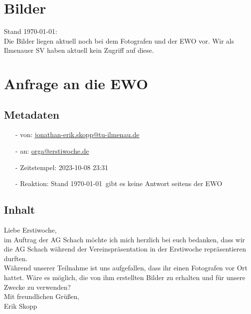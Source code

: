 \documentclass[a4paper,ngerman]{tui-algo-seminar}
\begin{document}
\section{Bilder}
Stand \today: \\
Die Bilder liegen aktuell noch bei dem Fotografen und der EWO vor. Wir als Ilmenauer SV haben aktuell kein Zugriff auf diese. 

\section{Anfrage an die EWO}
\subsection{Metadaten}
\begin{itemize}
    \item[-] von: \hyperlink{mailto:jonathan-erik.skopp@tu-ilmenau.de}{jonathan-erik.skopp@tu-ilmenau.de}
    \item[-] an:  \hyperlink{mailto:orga@erstiwoche.de}{orga@erstiwoche.de}
    \item[-] Zeitstempel:  2023-10-08 23:31
    \item[-] Reaktion: Stand \today ~gibt es keine Antwort seitens der EWO
\end{itemize}

\subsection{Inhalt}
Liebe Erstiwoche,\\
im Auftrag der AG Schach möchte ich mich herzlich bei euch bedanken, dass wir die AG Schach während der Vereinspräsentation in der Erstiwoche repräsentieren durften.\\
Während unserer Teilnahme ist uns aufgefallen, dass ihr einen Fotografen vor Ort hattet. Wäre es möglich, die von ihm erstellten Bilder zu erhalten und für unsere Zwecke zu verwenden?\\
Mit freundlichen Grüßen, \\ 
Erik Skopp\\
\end{document}
